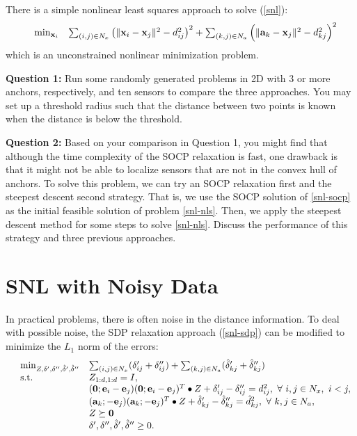 \documentclass[10pt]{article}
\newcommand\x{{\bf x}}
\newcommand\e{{\bf e}}
\newcommand\bz{{\bf 0}}
\renewcommand\a{{\bf a}}
\begin{document}
There is a simple nonlinear least squares approach to solve (\ref{snl}):
\begin{equation}\label{snl-nls}
\begin{array}{lll}
&\min_{\x_i}        & \sum_{(i,j)\in N_x}\left(\|\x_i-\x_j\|^2 - d_{ij}^2\right)^2+\sum_{(k,j)\in N_a} \left(\|\a_k-\x_j\|^2 - d_{kj}^2\right)^2
\end{array}
\end{equation}
which is an unconstrained nonlinear minimization problem.

{\bf Question 1:} Run some randomly generated problems in 2D with 3 or more anchors, respectively, and ten sensors to compare the three approaches. You may set up a threshold radius such that the distance between two points is known when the distance is below the threshold.

{\bf Question 2:} Based on your comparison in Question 1, you might find that although the time complexity of the SOCP relaxation is fast, one drawback is that it might not be able to localize sensors that are not in the convex hull of anchors. To solve this problem, we can try an SOCP relaxation first and the steepest descent second strategy. That is, we use the SOCP solution of \eqref{snl-socp} as the initial feasible solution of problem  \eqref{snl-nls}. Then, we apply the steepest descent method for some steps to solve \eqref{snl-nls}. Discuss the performance of this strategy and three previous approaches.

\section{SNL with Noisy Data}
In practical problems, there is often noise in the distance information. To deal with possible noise, the SDP relaxation
approach (\ref{snl-sdp}) can be modified to minimize the $L_1$ norm of the errors:
\begin{equation}\label{snl-sdp-noisequit}
\begin{array}{lll}
&\min_{Z,\delta', \delta'', \hat{\delta}', \hat{\delta}''}        & \sum_{(i,j)\in N_x}(\delta'_{ij}+\delta''_{ij})+\sum_{(k,j)\in N_a}(\hat\delta'_{kj}+\hat\delta''_{kj})\\
&\mbox{s.t.} & Z_{1:d,1:d}=I,\\
&             & (\bz;\e_i-\e_j)(\bz;\e_i-\e_j)^T\bullet Z+\delta'_{ij}-\delta''_{ij} =d_{ij}^2,\ \forall\ i,j\in N_x,\ i<j,\\
&             & (\a_k;-\e_{j}) (\a_k;-\e_{j})^T\bullet Z+\hat\delta'_{kj}- \hat\delta''_{kj}= \hat{d}_{kj}^2,\ \forall\ k,j\in N_a,\\
&             & Z\succeq \bz\\
&             & \delta', \delta'', \hat{\delta}', \hat{\delta}'' \geq 0.
\end{array}
\end{equation}
\end{document}

